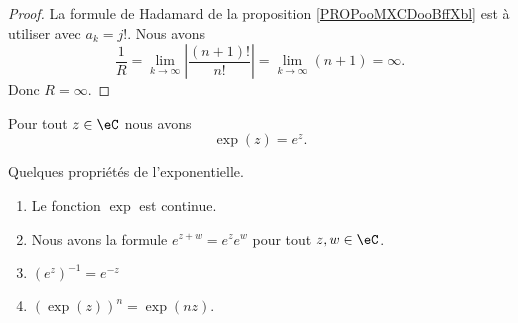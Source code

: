 \begin{proof}
	La formule de Hadamard de la proposition \ref{PROPooMXCDooBffXbl} est à utiliser avec \( a_k=j!\). Nous avons
	\begin{equation}
		\frac{1}{ R }=\lim_{k\to \infty} \left| \frac{ (n+1)! }{ n! } \right| =\lim_{k\to \infty} (n+1)=\infty.
	\end{equation}
	Donc \( R=\infty\).
\end{proof}

\begin{proposition}     \label{PROPooWSDKooJREQGk}
	Pour tout \( z\in \eC\) nous avons
	\begin{equation}
		\exp(z)= e^{z}.
	\end{equation}
\end{proposition}

\begin{proposition}     \label{PropdDjisy}
	Quelques propriétés de l'exponentielle.
	\begin{enumerate}
		\item
		      Le fonction \( \exp\) est continue.
		\item       \label{ITEMooRLHCooJTuYKV}
		      Nous avons la formule \(  e^{z+w}= e^{z}e^w\) pour tout \( z,w\in \eC\).
		\item
		      \( (e^z)^{-1}= e^{-z}\)
		\item       \label{ITEMooIFYFooUniuKS}
		      \( (\exp(z))^n=\exp(nz)\).
	\end{enumerate}
\end{proposition}

